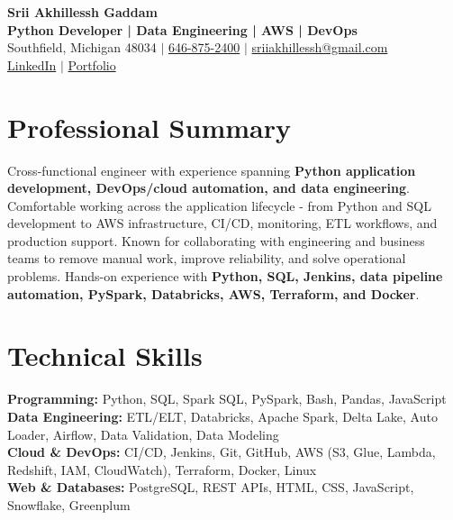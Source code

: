 \documentclass[letterpaper,10pt]{article}
\begin{document}
\fontsize{9.35pt}{10.45pt}\selectfont

\begin{center}
    {\LARGE \textbf{Srii Akhillessh Gaddam}} \\[-1pt]
    \textbf{Python Developer | Data Engineering | AWS | DevOps} \\[2pt]
    Southfield, Michigan 48034 $|$
    \href{tel:6468752400}{646-875-2400} $|$
    \href{mailto:sriiakhillessh@gmail.com}{sriiakhillessh@gmail.com} \\[1pt]
    \href{https://www.linkedin.com/in/srii-akhiilessh-gaddam-b48668191/}{LinkedIn} $|$
    \href{https://sriiakhillesshg.github.io/portfolio/}{Portfolio}
\end{center}
\vspace{-8pt}

\section{Professional Summary}
\small{Cross-functional engineer with experience spanning \textbf{Python application development, DevOps/cloud automation, and data engineering}. Comfortable working across the application lifecycle - from Python and SQL development to AWS infrastructure, CI/CD, monitoring, ETL workflows, and production support. Known for collaborating with engineering and business teams to remove manual work, improve reliability, and solve operational problems. Hands-on experience with \textbf{Python, SQL, Jenkins, data pipeline automation, PySpark, Databricks, AWS, Terraform, and Docker}.}

\section{Technical Skills}
\small{
\textbf{Programming:} Python, SQL, Spark SQL, PySpark, Bash, Pandas, JavaScript \\
\textbf{Data Engineering:} ETL/ELT, Databricks, Apache Spark, Delta Lake, Auto Loader, Airflow, Data Validation, Data Modeling \\
\textbf{Cloud \& DevOps:} CI/CD, Jenkins, Git, GitHub, AWS (S3, Glue, Lambda, Redshift, IAM, CloudWatch), Terraform, Docker, Linux \\
\textbf{Web \& Databases:} PostgreSQL, REST APIs, HTML, CSS, JavaScript, Snowflake, Greenplum
}
\end{document}
